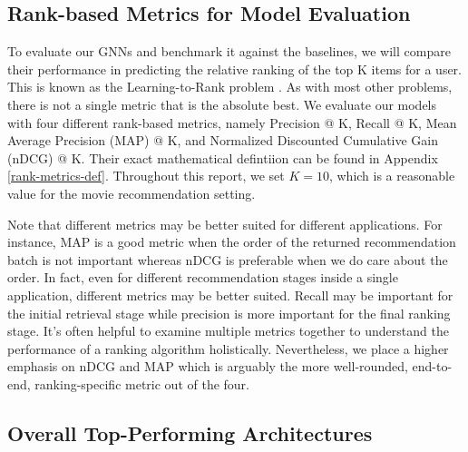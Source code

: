 \documentclass{article}
\begin{document}

\subsection{Rank-based Metrics for Model Evaluation} \label{metrics}


To evaluate our GNNs and benchmark it against the baselines, we will compare their performance in predicting the relative ranking of the top K items for a user. This is known as the Learning-to-Rank problem \cite{learning_to_rank}. As with most other problems, there is not a single metric that is the absolute best. We evaluate our models with four different rank-based metrics, namely Precision @ K, Recall @ K, Mean Average Precision (MAP) @ K, and Normalized Discounted Cumulative Gain (nDCG) @ K. Their exact mathematical defintiion can be found in Appendix \ref{rank-metrics-def}. Throughout this report, we set $K = 10$, which is a reasonable value for the movie recommendation setting.

Note that different metrics may be better suited for different applications. For instance, MAP is a good metric when the order of the returned recommendation batch is not important whereas nDCG is preferable when we do care about the order. In fact, even for different recommendation stages inside a single application, different metrics may be better suited. Recall may be important for the initial retrieval stage while precision is more important for the final ranking stage. It's often helpful to examine multiple metrics together to understand the performance of a ranking algorithm holistically. Nevertheless, we place a higher emphasis on nDCG and MAP which is arguably the more well-rounded, end-to-end, ranking-specific metric out of the four.

\subsection{Overall Top-Performing Architectures}
\end{document}
